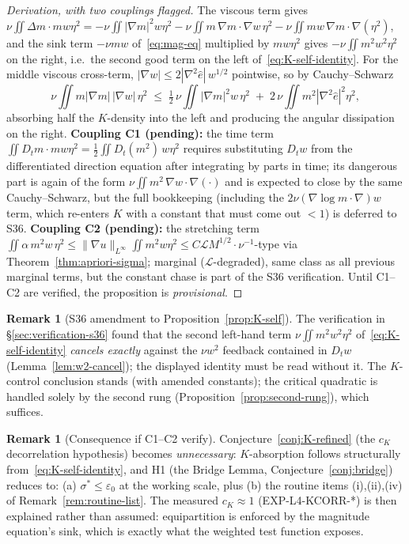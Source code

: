 \documentclass[11pt]{article}
\theoremstyle{definition}
\newtheorem{remark}[theorem]{Remark}
\theoremstyle{remark}
\begin{document}
\begin{proof}[Derivation, with two couplings flagged]
  The viscous term gives
  $\nu\iint \Delta m\cdot m w\eta^2 =
  -\nu\iint|\nabla m|^2 w\eta^2
  -\nu\iint m\,\nabla m\cdot\nabla w\,\eta^2
  -\nu\iint m w\,\nabla m\cdot\nabla(\eta^2)$,
  and the sink term $-\nu m w$ of~\eqref{eq:mag-eq} multiplied by
  $m w \eta^2$ gives $-\nu\iint m^2w^2\eta^2$ on the right, i.e.\ the
  second good term on the left of~\eqref{eq:K-self-identity}. For the
  middle viscous cross-term, $|\nabla w| \leq 2|\nabla^2\hat{e}|\,w^{1/2}$
  pointwise, so by Cauchy--Schwarz
  \[
    \nu\iint m|\nabla m|\,|\nabla w|\,\eta^2
    \;\leq\; \tfrac12\,\nu\iint|\nabla m|^2 w\,\eta^2
    \;+\; 2\,\nu\iint m^2|\nabla^2\hat{e}|^2\eta^2,
  \]
  absorbing half the $K$-density into the left and producing the angular
  dissipation on the right. \textbf{Coupling C1 (pending):} the time term
  $\iint D_t m\cdot m w\eta^2 = \tfrac12\iint D_t(m^2)\,w\eta^2$ requires
  substituting $D_t w$ from the differentiated direction equation after
  integrating by parts in time; its dangerous part is again of the form
  $\nu\iint m^2\,\nabla w\cdot\nabla(\cdot)$ and is expected to close by
  the same Cauchy--Schwarz, but the full bookkeeping (including the
  $2\nu(\nabla\log m\cdot\nabla)w$ term, which re-enters $K$ with a
  constant that must come out $<1$) is deferred to S36.
  \textbf{Coupling C2 (pending):} the stretching term
  $\iint \alpha\,m^2 w\,\eta^2 \leq \|\nabla u\|_{L^\infty} \iint m^2w\eta^2
  \leq C\mathcal{L}M^{1/2}\cdot\nu^{-1}$-type via
  Theorem~\ref{thm:apriori-sigma}; marginal ($\mathcal{L}$-degraded), same
  class as all previous marginal terms, but the constant chase is part of
  the S36 verification. Until C1--C2 are verified, the proposition is
  \emph{provisional}.
\end{proof}

\begin{remark}[S36 amendment to Proposition~\ref{prop:K-self}]
  The verification in \S\ref{sec:verification-s36} found that the second
  left-hand term $\nu\iint m^2w^2\eta^2$ of~\eqref{eq:K-self-identity}
  \emph{cancels exactly} against the $\nu w^2$ feedback contained in
  $D_t w$ (Lemma~\ref{lem:w2-cancel}); the displayed identity must be read
  without it. The $K$-control conclusion stands (with amended constants);
  the critical quadratic is handled solely by the second rung
  (Proposition~\ref{prop:second-rung}), which suffices.
\end{remark}

\begin{remark}[Consequence if C1--C2 verify]\label{rem:if-verified}
  Conjecture~\ref{conj:K-refined} (the $c_K$ decorrelation hypothesis)
  becomes \emph{unnecessary}: $K$-absorption follows structurally
  from~\eqref{eq:K-self-identity}, and H1 (the Bridge Lemma,
  Conjecture~\ref{conj:bridge}) reduces to: (a) $\sigma^*\leq\varepsilon_0$
  at the working scale, plus (b) the routine items (i),(ii),(iv) of
  Remark~\ref{rem:routine-list}. The measured $c_K\approx 1$
  (EXP-L4-KCORR-*) is then explained rather than assumed: equipartition is
  enforced by the magnitude equation's sink, which is exactly what the
  weighted test function exposes.
\end{remark}
\end{document}
